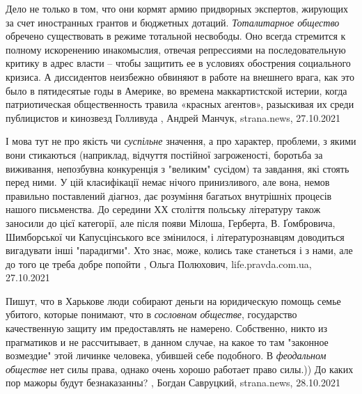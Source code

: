 Дело не только в том, что они кормят армию придворных экспертов, жирующих за
счет иностранных грантов и бюджетных дотаций. \emph{Тоталитарное общество}
обречено существовать в режиме тотальной несвободы. Оно всегда стремится к
полному искоренению инакомыслия, отвечая репрессиями на последовательную
критику в адрес власти – чтобы защитить ее в условиях обострения социального
кризиса.  А диссидентов неизбежно обвиняют в работе на внешнего врага, как это
было в пятидесятые годы в Америке, во времена маккартистской истерии, когда
патриотическая общественность травила «красных агентов», разыскивая их среди
публицистов и кинозвезд Голливуда
, 
Андрей Манчук, strana.news, 27.10.2021

І мова тут не про якість чи \emph{суспільне} значення, а про характер,
проблеми, з якими вони стикаються (наприклад, відчуття постійної загроженості,
боротьба за виживання, непозбувна конкуренція з "великим" сусідом) та завдання,
які стоять перед ними.  У цій класифікації немає нічого принизливого, але вона,
немов правильно поставлений діагноз, дає розуміння багатьох внутрішніх процесів
нашого письменства.  До середини ХХ століття польську літературу також заносили
до цієї категорії, але після появи Мілоша, Герберта, В. Ґомбровича, Шимборської
чи Капусцінського все змінилося, і літературознавцям доводиться вигадувати інші
"парадигми".  Хто знає, може, колись таке станеться і з нами, але до того це
треба добре попойти
, Ольга Полюхович, life.pravda.com.ua, 27.10.2021

Пишут, что в Харькове люди собирают деньги на юридическую помощь семье убитого,
которые понимают, что в \emph{сословном обществе}, государство качественную защиту им
предоставлять не намерено. Собственно, никто из прагматиков и не рассчитывает,
в данном случае, на какое то там "законное возмездие" этой личинке человека,
убившей себе подобного.  В \emph{феодальном обществе} нет силы права, однако очень
хорошо работает право силы.)) До каких пор мажоры будут безнаказанны?
, 
Богдан Савруцкий, strana.news, 28.10.2021

